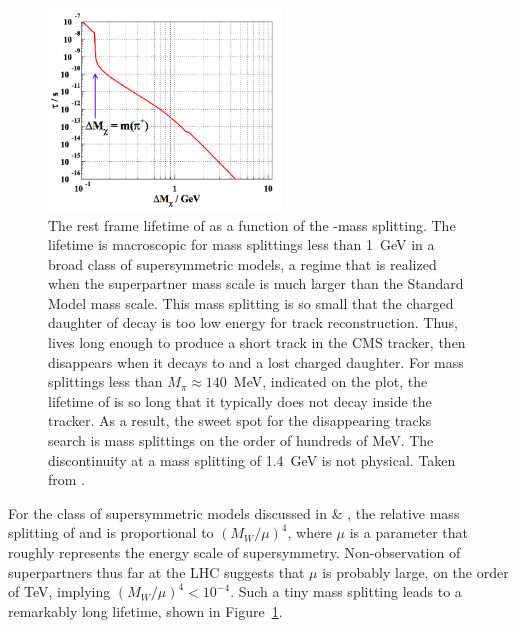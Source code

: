   \begin{figure}[htbp]
    \centering
    \includegraphics[width=0.55\textwidth]{figures/chargino_lifetime.png}
    \caption[Lifetime of \chargino as a function of mass splitting.]{
      The rest frame lifetime of \chargino as a function of the \chargino-\lsp mass splitting. 
      The lifetime is macroscopic for mass splittings less than 1~GeV in a broad class of supersymmetric models, a regime that is realized  when the superpartner mass scale is much larger than the Standard Model mass scale. 
      This mass splitting is so small that the charged daughter of \chargino decay is too low energy for track reconstruction.
      Thus, \chargino lives long enough to produce a short track in the CMS tracker, then disappears when it decays to \lsp and a lost charged daughter.
      For mass splittings less than $M_{\pi} \approx 140$~MeV, indicated on the plot, the lifetime of \chargino is so long that it typically does not decay inside the tracker.
      As a result, the sweet spot for the disappearing tracks search is mass splittings on the order of hundreds of MeV.
      The discontinuity at a mass splitting of 1.4~GeV is not physical.
      Taken from \cite{AMSBlifetime}.}
    \label{fig:charginolifetime}
  \end{figure}

  For the class of supersymmetric models discussed in \cite{distracksAMSB} \& \cite{AMSBlifetime}, the relative mass splitting of \chargino and \lsp is proportional to $(M_{W}/\mu)^4$, where $\mu$ is a parameter that roughly represents the energy scale of supersymmetry.
  Non-observation of superpartners thus far at the LHC suggests that $\mu$ is probably large, on the order of TeV, implying $(M_{W}/\mu)^4 < 10^{-4}$.
  Such a tiny mass splitting leads to a remarkably long \chargino lifetime, shown in Figure~\ref{fig:charginolifetime}.

